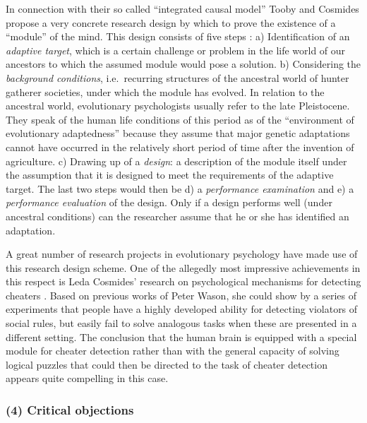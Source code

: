 In connection with their so called ``integrated causal model'' Tooby and
Cosmides propose a very concrete research design by which to prove the
existence of a ``module'' of the mind.  This design consists of five steps
\cite[p.\ 73/74]{tooby-cosmides:1992}: a) Identification of an {\em adaptive
  target}, which is a certain challenge or problem in the life world of our
ancestors to which the assumed module would pose a solution.  b) Considering
the {\em background conditions}, i.e.\ recurring structures of the ancestral
world of hunter gatherer societies, under which the module has evolved. In
relation to the ancestral world, evolutionary psychologists usually refer to
the late Pleistocene. They speak of the human life conditions of this period
as of the ``environment of evolutionary adaptedness'' \cite[p.\ 
69]{tooby-cosmides:1992} because they assume that major genetic adaptations
cannot have occurred in the relatively short period of time after the
invention of agriculture. c) Drawing up of a {\em design}: a description of
the module itself under the assumption that it is designed to meet the
requirements of the adaptive target. The last two steps would then be d) a
{\em performance examination} and e) a {\em performance evaluation} of the
design. Only if a design performs well (under ancestral conditions) can the
researcher assume that he or she has identified an adaptation.

A great number of research projects in evolutionary psychology have made use
of this research design scheme. One of the allegedly most impressive
achievements in this respect is Leda Cosmides' research on psychological
mechanisms for detecting cheaters \cite[p.\ 168/169]{laland-brown:2004}. Based
on previous works of Peter Wason, she could show by a series of experiments
that people have a highly developed ability for detecting violators of social
rules, but easily fail to solve analogous tasks when these are presented in a
different setting. The conclusion that the human brain is equipped with a
special module for cheater detection rather than with the general capacity of
solving logical puzzles that could then be directed to the task of cheater
detection appears quite compelling in this case.

\subsubsection{(4) Critical objections} 

